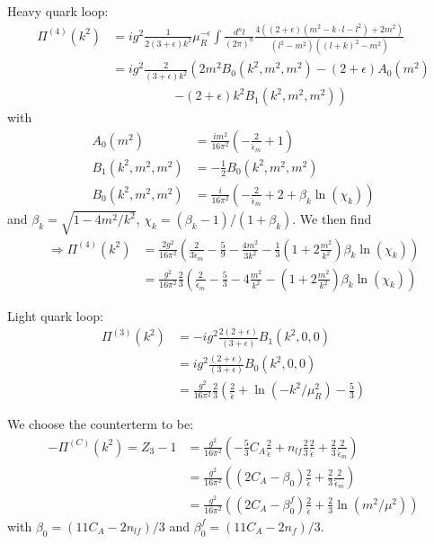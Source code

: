 Heavy quark loop:
\begin{align}
\Pi^{(4)}(k^2) &= ig^2\frac {1} {2(3+\epsilon)k^2}\mu_R^{-\epsilon}\!\!\int\!\!\frac{d^nl}{(2\pi)^n} \frac{4((2+\epsilon)(m^2-k\cdot l - l^2)+2m^2)}{(l^2-m^2)((l+k)^2-m^2)}\\
 &= ig^2\frac {2}{(3+\epsilon)k^2}\left(2m^2B_0(k^2,m^2,m^2)-(2+\epsilon)A_0(m^2)\right.\nonumber\\
 &\hspace{60pt}\left.-(2+\epsilon)k^2B_1(k^2,m^2,m^2)\right)
\end{align}
with
\begin{align}
A_0(m^2) &= \frac {i m^2}{16\pi^2}\left(-\frac 2 {\hat \epsilon_m} + 1 \right)\\
B_1(k^2,m^2,m^2) &= -\frac 1 2 B_0(k^2,m^2,m^2)\\
B_0(k^2,m^2,m^2) &= \frac i {16\pi^2}\left(-\frac 2 {\hat \epsilon_m} + 2 + \beta_k\ln(\chi_k) \right)
\end{align}
and $\beta_k=\sqrt{1-4m^2/k^2}$, $\chi_k=(\beta_k-1)/(1+\beta_k)$. We then find
\begin{align}
\Rightarrow \Pi^{(4)}(k^2) &= \frac {2g^2}{16\pi^2}\left(\frac 2 {3\hat \epsilon_m}-\frac 5 9 -\frac{4m^2}{3k^2} - \frac 1 3 \left(1+2\frac{m^2}{k^2}\right)\beta_k\ln(\chi_k)\right)\\
&= \frac {g^2}{16\pi^2}\frac 2 3\left(\frac 2 {\hat \epsilon_m}-\frac 5 3 -4\frac{m^2}{k^2} - \left(1+2\frac{m^2}{k^2}\right)\beta_k\ln(\chi_k)\right)
\end{align}

Light quark loop:
\begin{align}
\Pi^{(3)}(k^2) &= -ig^2\frac {2(2+\epsilon)}{(3+\epsilon)}B_1(k^2,0,0)\\
 &= ig^2\frac {(2+\epsilon)}{(3+\epsilon)}B_0(k^2,0,0)\\
 &=\frac{g^2}{16\pi^2}\frac 2 3\left(\frac 2 {\hat \epsilon} + \ln(-k^2/\mu_R^2)-\frac 5 3\right)
\end{align}

We choose the counterterm to be:
\begin{align}
-\Pi^{(C)}(k^2)=Z_3-1 &= \frac{g^2}{16\pi^2}\left(-\frac 5 3 C_A \frac 2 {\hat \epsilon} + n_{lf}\frac 2 3 \frac 2 {\hat \epsilon} + \frac 2 3 \frac 2 {\hat \epsilon_m}\right)\\
 &= \frac{g^2}{16\pi^2}\left( (2C_A-\beta_0)\frac 2 {\hat\epsilon}+ \frac 2 3 \frac 2 {\hat \epsilon_m} \right)\\
 &= \frac{g^2}{16\pi^2}\left( (2C_A-\beta_0^f)\frac 2 {\hat\epsilon}+ \frac 2 3 \ln(m^2/\mu^2) \right)
\end{align}
with $\beta_0 = (11C_A-2n_{lf})/3$ and $\beta_0^f = (11C_A-2n_{f})/3$.
